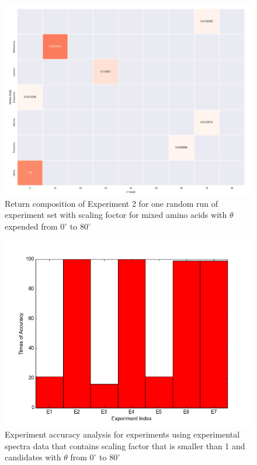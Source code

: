 \begin{figure}[!ht] 
\centering
\includegraphics[scale=0.4]{Figures/chapter6_figure_two.png}
\caption{Return composition of Experiment 2 for one random run of experiment set with scaling foctor for mixed amino acids with $\theta$ expended from $0^{\circ}$ to $80^{\circ}$} \label{fig:6.2}
\end{figure}

\begin{figure}[!ht] 
\centering
\includegraphics[scale=0.6]{Figures/chapter6_1.png}
\caption{Experiment accuracy analysis for experiments using experimental spectra data that contains scaling factor that is smaller than 1 and candidates with $\theta$ from $0^{\circ}$ to $80^{\circ}$}
\label{fig:6.3}
\end{figure}

